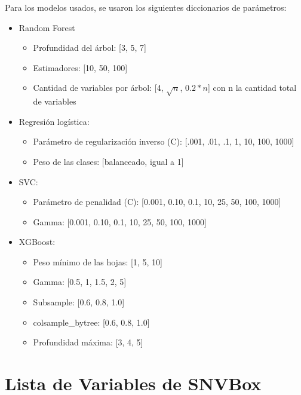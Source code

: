 Para los modelos usados, se usaron los siguientes diccionarios de parámetros:
\begin{itemize}
    \item Random Forest
        \begin{itemize}
            \item Profundidad del árbol: [3, 5, 7]
            \item Estimadores: [10, 50, 100]
            \item Cantidad de variables por árbol: [4, $\sqrt{n}$, $0.2*n$] con n la cantidad total de variables
        \end{itemize} 
    \item Regresión logística:
        \begin{itemize}
            \item Parámetro de regularización inverso (C): [.001, .01, .1, 1, 10, 100, 1000]
            \item Peso de las clases: [balanceado, igual a 1]
        \end{itemize}
    \item SVC:
        \begin{itemize}
            \item Parámetro de penalidad (C): [0.001, 0.10, 0.1, 10, 25, 50, 100, 1000]
            \item Gamma: [0.001, 0.10, 0.1, 10, 25, 50, 100, 1000]
        \end{itemize}
    \item XGBoost:
        \begin{itemize}
            \item Peso mínimo de las hojas: [1, 5, 10]
            \item Gamma: [0.5, 1, 1.5, 2, 5]
            \item Subsample: [0.6, 0.8, 1.0]
            \item colsample\_bytree: [0.6, 0.8, 1.0]
            \item Profundidad máxima: [3, 4, 5]
        \end{itemize}
\end{itemize}


\section{Lista de Variables de SNVBox}

